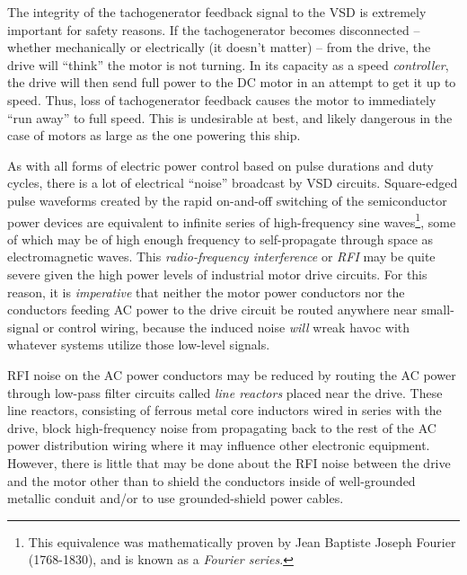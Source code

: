 The integrity of the tachogenerator feedback signal to the VSD is extremely important for safety reasons.  If the tachogenerator becomes disconnected -- whether mechanically or electrically (it doesn't matter) -- from the drive, the drive will ``think'' the motor is not turning.  In its capacity as a speed \textit{controller}, the drive will then send full power to the DC motor in an attempt to get it up to speed.  Thus, loss of tachogenerator feedback causes the motor to immediately ``run away'' to full speed.  This is undesirable at best, and likely dangerous in the case of motors as large as the one powering this ship.

\vskip 10pt

As with all forms of electric power control based on pulse durations and duty cycles, there is a lot of electrical ``noise'' broadcast by VSD circuits.  Square-edged pulse waveforms created by the rapid on-and-off switching of the semiconductor power devices are equivalent to infinite series of high-frequency sine waves\footnote{This equivalence was mathematically proven by Jean Baptiste Joseph Fourier (1768-1830), and is known as a \textit{Fourier series}.}, some of which may be of high enough frequency to self-propagate through space as electromagnetic waves.  This \textit{radio-frequency interference} or \textit{RFI} may be quite severe given the high power levels of industrial motor drive circuits.  For this reason, it is \textit{imperative} that neither the motor power conductors nor the conductors feeding AC power to the drive circuit be routed anywhere near small-signal or control wiring, because the induced noise \textit{will} wreak havoc with whatever systems utilize those low-level signals.        

RFI noise on the AC power conductors may be reduced by routing the AC power through low-pass filter circuits called \textit{line reactors} placed near the drive.  These line reactors, consisting of ferrous metal core inductors wired in series with the drive, block high-frequency noise from propagating back to the rest of the AC power distribution wiring where it may influence other electronic equipment.  However, there is little that may be done about the RFI noise between the drive and the motor other than to shield the conductors inside of well-grounded metallic conduit and/or to use grounded-shield power cables.  












